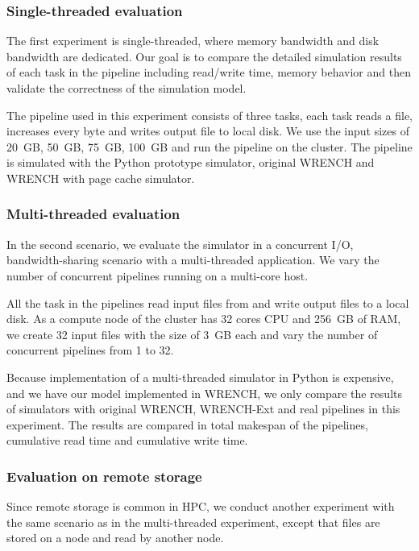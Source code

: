 \documentclass[conference]{IEEEtran}
\begin{document}
			\subsubsection{Single-threaded evaluation}
			
			The first experiment is single-threaded, where memory bandwidth 
			and disk bandwidth are dedicated. 
			Our goal is to compare the detailed simulation results of each task 
			in the pipeline including read/write time, memory behavior and 
			then validate the correctness of the simulation model. 

			The pipeline used in this experiment consists of three tasks, 
			each task reads a file, increases every byte and writes output file 
			to local disk. 
			We use the input sizes of 20~GB, 50~GB, 75~GB, 100~GB and run 
			the pipeline on the cluster.
			The pipeline is simulated with the Python prototype simulator, 
			original WRENCH and WRENCH with page cache simulator. 
			
			\subsubsection{Multi-threaded evaluation}

			In the second scenario, we evaluate the simulator in a concurrent I/O, 
			bandwidth-sharing scenario with a multi-threaded application. 			
			We vary the number of concurrent pipelines running on a multi-core host.  
			
			All the task in the pipelines read input files from and write output files 
			to a local disk. 
			As a compute node of the cluster has 32 cores CPU and 256~GB of RAM,  
			we create 32 input files with the size of 3~GB each and vary the number of 
			concurrent pipelines from 1 to 32. 
			
			Because implementation of a multi-threaded simulator in Python is 
			expensive, and we have our model implemented in WRENCH, 
			we only compare the results of simulators with original WRENCH, 
			WRENCH-Ext and real pipelines in this experiment. 
			The results are compared in total makespan of the pipelines, 
			cumulative read time and cumulative write time.
			
			\subsubsection{Evaluation on remote storage}
			
		    Since remote storage is common in HPC, we conduct another experiment with 
		    the same scenario as in the multi-threaded experiment, except that files 
		    are stored on a node and read by another node. 
		    
\end{document}
